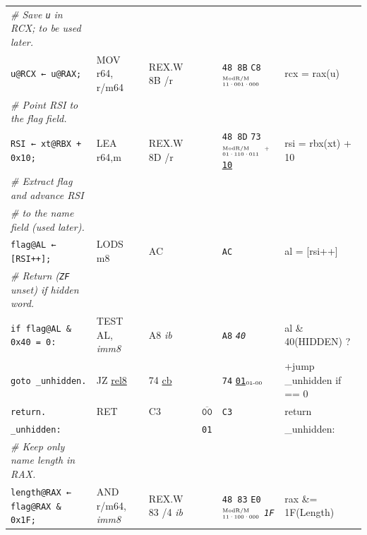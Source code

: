 \documentclass[a4paper,12pt,final]{article}
\begin{document}
\begin{table}[!htbp]
\begin{adjustwidth}{-1cm}{-1cm}
\begin{center}
\begin{tabular}{l|ll|l|lH}
\hspace{1.053000em} \emph{\# Save \texttt{u} in RCX; to be used later.} &  &  &  &  & \\[0pt]
\hspace{1.053000em} \texttt{u@RCX ← u@RAX;} & MOV r64, r/m64 & REX.W 8B /r &  & \texttt{48 8B} \texttt{C8}​\(^{\text{\tiny ModR/M}}_{\text{\tiny 11·001·000}}\) & rcx = rax(u)\\[0pt]
\hspace{1.053000em} \emph{\# Point RSI to the flag field.} &  &  &  &  & \\[0pt]
\hspace{1.053000em} \texttt{RSI ← xt@RBX + 0x10;} & LEA r64,m & REX.W 8D /r &  & \texttt{48 8D} \texttt{73}​\(^{\text{\tiny ModR/M}}_{\text{\tiny 01·110·011}}\) \(^{\text{\tiny +}}\)​\uline{\texttt{10}} & rsi = rbx(xt) + 10\\[0pt]
\hspace{1.053000em} \emph{\# Extract flag and advance RSI} &  &  &  &  & \\[0pt]
\hspace{1.053000em} \emph{\# to the name field (used later).} &  &  &  &  & \\[0pt]
\hspace{1.053000em} \texttt{flag@AL ← [RSI++];} & LODS m8 & AC &  & \texttt{AC} & al = [rsi++]\\[0pt]
\hspace{1.053000em} \emph{\# Return (\texttt{ZF} unset) if hidden word.} &  &  &  &  & \\[0pt]
\hspace{1.053000em} \texttt{if flag@AL \& 0x40 = 0:} & TEST AL, \emph{imm8} & A8 \emph{ib} &  & \texttt{A8} \emph{\texttt{40}} & al \& 40(HIDDEN) ?\\[0pt]
\hspace{2.106000em}   \texttt{goto \_unhidden.} & JZ \uline{rel8} & 74 \uline{cb} &  & \texttt{74} \uline{\texttt{01}}​\(_{\text{\tiny 01-00}}\) & +jump \_unhidden if == 0\\[0pt]
\hspace{1.053000em} \texttt{return.} & RET & C3 & \(\overline{\texttt{00}}\) & \texttt{C3} & return\\[0pt]
\texttt{\_unhidden:} &  &  & \texttt{01} &  & \_unhidden:\\[0pt]
\hspace{1.053000em} \emph{\# Keep only name length in RAX.} &  &  &  &  & \\[0pt]
\hspace{1.053000em} \texttt{length@RAX ← flag@RAX \& 0x1F;} & AND r/m64, \emph{imm8} & REX.W 83 /​4 \emph{ib} &  & \texttt{48 83} \texttt{E0}​\(^{\text{\tiny ModR/M}}_{\text{\tiny 11·100·000}}\) \emph{\texttt{1F}} & rax \&= 1F(Length)\\[0pt]

\end{tabular}
\end{center}
\end{adjustwidth}
\end{table}
\end{document}
